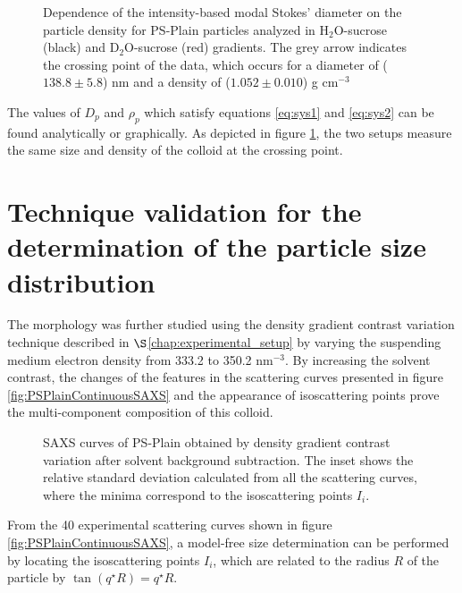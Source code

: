 \begin{figure}
	\begin{center}
		
	\end{center}
	\caption{Dependence of the intensity-based modal Stokes' diameter on the particle density for PS-Plain particles analyzed in H$_2$O-sucrose (black) and D$_2$O-sucrose (red) gradients. The grey arrow indicates the crossing point of the data, which occurs for a diameter of ($138.8\pm5.8$) nm and a density of ($1.052\pm0.010$) g cm$^{-3}$}
	\label{fig:DCSCombinedStokes}
\end{figure}

The values of $D_p$ and $\rho_p$ which satisfy equations \ref{eq:sys1} and \ref{eq:sys2} can be found analytically or graphically. As depicted in figure \ref{fig:DCSCombinedStokes}, the two setups measure the same size and density of the colloid at the crossing point.

\section{Technique validation for the determination of the particle size distribution}
\label{sec:size_validation}
The morphology was further studied using the density gradient contrast variation technique described in $\S$\ref{chap:experimental_setup} by varying the suspending medium electron density from 333.2 to 350.2 nm$^{-3}$. By increasing the solvent contrast, the changes of the features in the scattering curves presented in figure \ref{fig:PSPlainContinuousSAXS} and the appearance of isoscattering points prove the multi-component composition of this colloid.

\begin{figure}%
	\centering
	\caption{SAXS curves of PS-Plain obtained by density gradient contrast variation after solvent background subtraction. The inset shows the relative standard
deviation calculated from all the scattering curves, where the minima correspond to the isoscattering points $I_i$.}
\end{figure}



From the 40 experimental scattering curves shown in figure \ref{fig:PSPlainContinuousSAXS}, a model-free size determination can be performed by locating the isoscattering points $I_i$, which are related to the radius $R$ of the particle by $\tan\left( q^{\star}R \right)=q^{\star}R$\citep{kawaguchi_x-ray_1983-1}.

